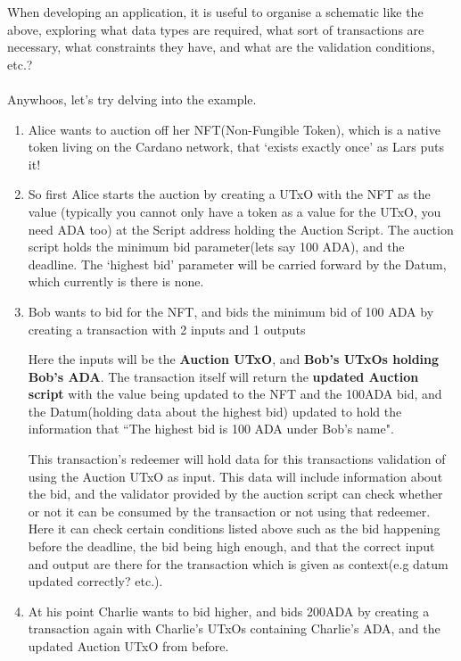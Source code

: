 \documentclass[a4paper, 11pt]{article}
\begin{document}
    When developing an application, it is useful to organise a schematic like the above, exploring what data types are required, what sort of transactions are necessary, what constraints they have, and what are the validation conditions, etc.?

    \paragraph{} Anywhoos, let's try delving into the example. 

    \begin{enumerate}
        \item Alice wants to auction off her NFT(Non-Fungible Token), which is a native token living on the Cardano network, that `exists exactly once' as Lars puts it!
        \item So first Alice starts the auction by creating a UTxO with the NFT as the value (typically you cannot only have a token as a value for the UTxO, you need ADA too) at the Script address holding the Auction Script. The auction script holds the minimum bid parameter(lets say 100 ADA), and the deadline. The `highest bid' parameter will be carried forward by the Datum, which currently is there is none.
        \item Bob wants to bid for the NFT, and bids the minimum bid of 100 ADA by creating a transaction with 2 inputs and 1 outputs
        
        Here the inputs will be the \textbf{Auction UTxO}, and \textbf{Bob's UTxOs holding Bob's ADA}. The transaction itself will return the \textbf{updated Auction script} with the value being updated to the NFT and the 100ADA bid, and the Datum(holding data about the highest bid) updated to hold the information that ``The highest bid is 100 ADA under Bob's name".

        This transaction's redeemer will hold data for this transactions validation of using the Auction UTxO as input. This data will include information about the bid, and the validator provided by the auction script can check whether or not it can be consumed by the transaction or not using that redeemer. Here it can check certain conditions listed above such as the bid happening before the deadline, the bid being high enough, and that the correct input and output are there for the transaction which is given as context(e.g datum updated correctly? etc.).

        \item At his point Charlie wants to bid higher, and bids 200ADA by creating a transaction again with Charlie's UTxOs containing Charlie's ADA, and the updated Auction UTxO from before.
        

\end{enumerate}
\end{document}
